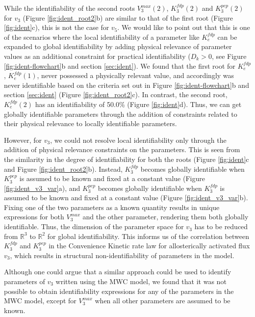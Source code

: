 \documentclass[10pt]{article}
\begin{document}
	While the identifiability of the second roots $V_3^{max}(2)$, $K_3^{fdp}(2)$ and $K_3^{pep}(2)$ for $v_3$ (Figure \ref{fig:ident_root2}b) are similar to that of the first root (Figure \ref{fig:ident}c), this is not the case for $v_5$. We would like to point out that this is one of the scenarios where the local identifiability of a parameter like $K_e^{fdp}$ can be expanded to global identifiability by adding physical relevance of parameter values as an additional constraint for practical identifiability ($D_k>0$, see Figure \ref{fig:ident-flowchart}b and section \ref{sec:ident}). We found that the first root for $K_e^{fdp}$, $K_e^{fdp}(1)$, never possessed a physically relevant value, and accordingly was never identifiable based on the criteria set out in Figure \ref{fig:ident-flowchart}b and section \ref{sec:ident} (Figure \ref{fig:ident_root2}c). In contrast, the second root, $K_e^{fdp}(2)$ has an identifiability of 50.0\% (Figure \ref{fig:ident}d). Thus, we can get globally identifiable parameters through the addition of constraints related to their physical relevance to locally identifiable parameters. 
	
	However, for $v_3$, we could not resolve local identifiability only through the addition of physical relevance constraints on the parameters. This is seen from the similarity in the degree of identifiability for both the roots (Figure \ref{fig:ident}c and Figure \ref{fig:ident_root2}b). Instead, $K_3^{fdp}$ becomes globally identifiable when $K_3^{pep}$ is assumed to be known and fixed at a constant value (Figure \ref{fig:ident_v3_var}a), and $K_3^{pep}$ becomes globally identifiable when $K_3^{fdp}$ is assumed to be known and fixed at a constant value (Figure \ref{fig:ident_v3_var}b). Fixing one of the two parameters as a known quantity results in unique expressions for both $V_3^{max}$ and the other parameter, rendering them both globally identifiable. Thus, the dimension of the parameter space for $v_3$ has to be reduced from $\mathbb{R}^3$ to $\mathbb{R}^2$ for global identifiability. This informs us of the correlation between $K_3^{fdp}$ and $K_3^{pep}$ in the Convenience Kinetic rate law for allosterically activated flux $v_3$, which results in structural non-identifiability of parameters in the model.
	
	 Although one could argue that a similar approach could be used to identify parameters of $v_3$ written using the MWC model, we found that it was not possible to obtain identifiability expressions for any of the parameters in the MWC model, except for $V_3^{max}$ when all other parameters are assumed to be known.	
	 
\end{document}
